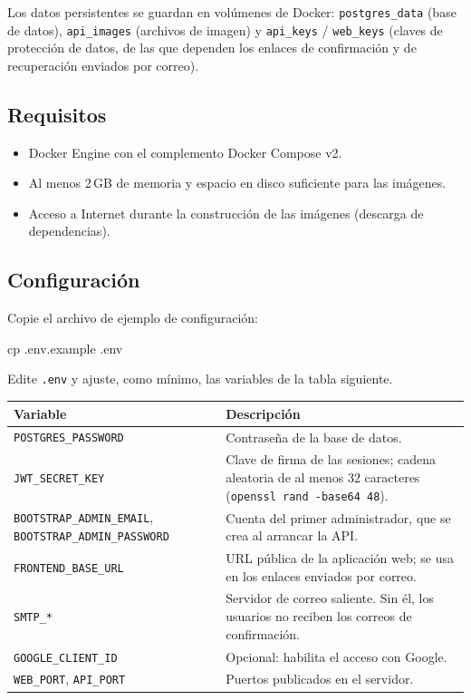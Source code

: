 \documentclass[11pt,a4paper]{article}
\begin{document}
Los datos persistentes se guardan en volúmenes de Docker:
\texttt{postgres\_data} (base de datos), \texttt{api\_images} (archivos de
imagen) y \texttt{api\_keys} / \texttt{web\_keys} (claves de protección de
datos, de las que dependen los enlaces de confirmación y de recuperación
enviados por correo).

\subsection{Requisitos}

\begin{itemize}
  \item Docker Engine con el complemento Docker Compose v2.
  \item Al menos 2\,GB de memoria y espacio en disco suficiente para las imágenes.
  \item Acceso a Internet durante la construcción de las imágenes (descarga de
  dependencias).
\end{itemize}

\subsection{Configuración}

\begin{pasos}
  \item Copie el archivo de ejemplo de configuración:
\begin{consola}
cp .env.example .env
\end{consola}
  \item Edite \texttt{.env} y ajuste, como mínimo, las variables de la tabla
  siguiente.
\end{pasos}

\begin{longtable}{@{}>{\raggedright\arraybackslash}p{} >{\raggedright\arraybackslash}p{}@{}}
\toprule
\rowcolor{dermaSoft}
\textbf{Variable} & \textbf{Descripción} \\
\midrule
\endhead
\texttt{POSTGRES\_PASSWORD} & Contraseña de la base de datos. \\
\texttt{JWT\_SECRET\_KEY} & Clave de firma de las sesiones; cadena aleatoria de al
menos 32 caracteres (\texttt{openssl rand -base64 48}). \\
\texttt{BOOTSTRAP\_ADMIN\_EMAIL}, \texttt{BOOTSTRAP\_ADMIN\_PASSWORD} & Cuenta del
primer administrador, que se crea al arrancar la API. \\
\texttt{FRONTEND\_BASE\_URL} & URL pública de la aplicación web; se usa en los
enlaces enviados por correo. \\
\texttt{SMTP\_*} & Servidor de correo saliente. Sin él, los usuarios no reciben
los correos de confirmación. \\
\texttt{GOOGLE\_CLIENT\_ID} & Opcional: habilita el acceso con Google. \\
\texttt{WEB\_PORT}, \texttt{API\_PORT} & Puertos publicados en el servidor. \\
\bottomrule
\end{longtable}
\end{document}
